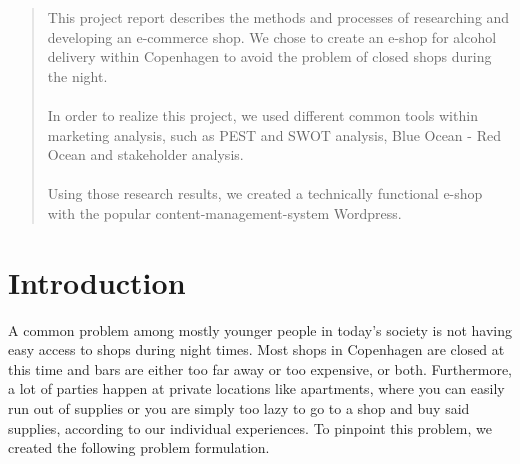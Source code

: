 \documentclass[12p]{article}
\begin{document}

\begin{abstract}
    This project report describes the methods and processes of researching and developing an e-commerce shop. We chose to create an e-shop for alcohol delivery within Copenhagen to avoid the problem of closed shops during the night.
    \\ \\
    In order to realize this project, we used different common tools within marketing analysis, such as PEST and SWOT analysis, Blue Ocean - Red Ocean and stakeholder analysis. 
    \\ \\
    Using those research results, we created a technically functional e-shop with the popular content-management-system Wordpress.
\end{abstract}

\newpage


\tableofcontents %

\newpage %


\section{Introduction}

A common problem among mostly younger people in today's society is not having easy access to shops during night times. Most shops in Copenhagen are closed at this time and bars are either too far away or too expensive, or both. Furthermore, a lot of parties happen at private locations like apartments, where you can easily run out of supplies or you are simply too lazy to go to a shop and buy said supplies, according to our individual experiences. To pinpoint this problem, we created the following problem formulation.
\end{document}
